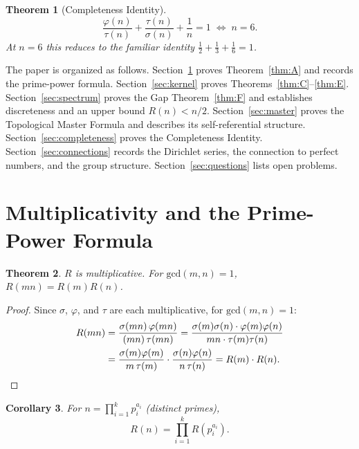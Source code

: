 \documentclass[12pt]{article}
\newtheorem{theorem}{Theorem}[section]
\newtheorem{corollary}[theorem]{Corollary}
\newcommand{\gcd}{\mathrm{gcd}}
\begin{document}
\begin{theorem}[Completeness Identity]\label{thm:J}
\[
  \frac{\varphi(n)}{\tau(n)} + \frac{\tau(n)}{\sigma(n)} + \frac{1}{n} = 1
  \;\iff\; n = 6.
\]
At $n=6$ this reduces to the familiar identity $\tfrac{1}{2}+\tfrac{1}{3}+\tfrac{1}{6}=1$.
\end{theorem}

\medskip
The paper is organized as follows.
Section~\ref{sec:mult} proves Theorem~\ref{thm:A} and records the prime-power
formula.  Section~\ref{sec:kernel} proves
Theorems~\ref{thm:C}--\ref{thm:E}.  Section~\ref{sec:spectrum} proves the Gap
Theorem~\ref{thm:F} and establishes discreteness and an upper bound
$R(n)<n/2$.  Section~\ref{sec:master} proves the Topological Master Formula and
describes its self-referential structure.
Section~\ref{sec:completeness} proves the Completeness Identity.
Section~\ref{sec:connections} records the Dirichlet series, the connection to
perfect numbers, and the group structure.  Section~\ref{sec:questions} lists
open problems.

\section{Multiplicativity and the Prime-Power Formula}
\label{sec:mult}

\begin{theorem}\label{thm:mult-full}
$R$ is multiplicative.  For $\gcd(m,n)=1$, $R(mn)=R(m)R(n)$.
\end{theorem}

\begin{proof}
Since $\sigma$, $\varphi$, and $\tau$ are each multiplicative, for
$\gcd(m,n)=1$:
\begin{align*}
  R(mn) &= \frac{\sigma(mn)\,\varphi(mn)}{(mn)\,\tau(mn)}
          = \frac{\sigma(m)\sigma(n)\cdot\varphi(m)\varphi(n)}%
                 {mn\cdot\tau(m)\tau(n)} \\
         &= \frac{\sigma(m)\varphi(m)}{m\,\tau(m)}\cdot
            \frac{\sigma(n)\varphi(n)}{n\,\tau(n)}
          = R(m)\cdot R(n). \qedhere
\end{align*}
\end{proof}

\begin{corollary}\label{cor:euler}
For $n = \prod_{i=1}^k p_i^{a_i}$ (distinct primes),
\[
  R(n) = \prod_{i=1}^k R(p_i^{a_i}).
\]
\end{corollary}
\end{document}

